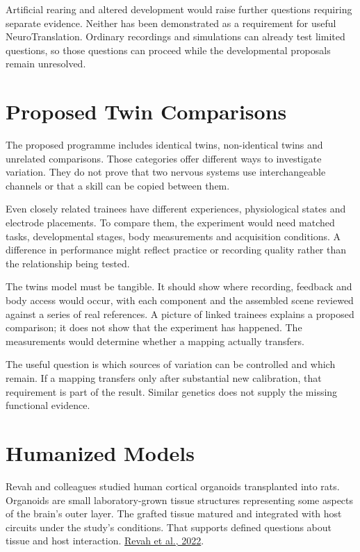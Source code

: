 Artificial rearing and altered development would raise further questions requiring separate evidence. Neither has been demonstrated as a requirement for useful NeuroTranslation. Ordinary recordings and simulations can already test limited questions, so those questions can proceed while the developmental proposals remain unresolved.\par

\section{Proposed Twin Comparisons}

The proposed programme includes identical twins, non-identical twins and unrelated comparisons. Those categories offer different ways to investigate variation. They do not prove that two nervous systems use interchangeable channels or that a skill can be copied between them.\par

Even closely related trainees have different experiences, physiological states and electrode placements. To compare them, the experiment would need matched tasks, developmental stages, body measurements and acquisition conditions. A difference in performance might reflect practice or recording quality rather than the relationship being tested.\par

The twins model must be tangible. It should show where recording, feedback and body access would occur, with each component and the assembled scene reviewed against a series of real references. A picture of linked trainees explains a proposed comparison; it does not show that the experiment has happened. The measurements would determine whether a mapping actually transfers.\par

The useful question is which sources of variation can be controlled and which remain. If a mapping transfers only after substantial new calibration, that requirement is part of the result. Similar genetics does not supply the missing functional evidence.\par

\section{Humanized Models}

Revah and colleagues studied human cortical organoids transplanted into rats. Organoids are small laboratory-grown tissue structures representing some aspects of the brain's outer layer. The grafted tissue matured and integrated with host circuits under the study's conditions. That supports defined questions about tissue and host interaction. \href{https://www.nature.com/articles/s41586-022-05277-w}{Revah et al., 2022}.\par

